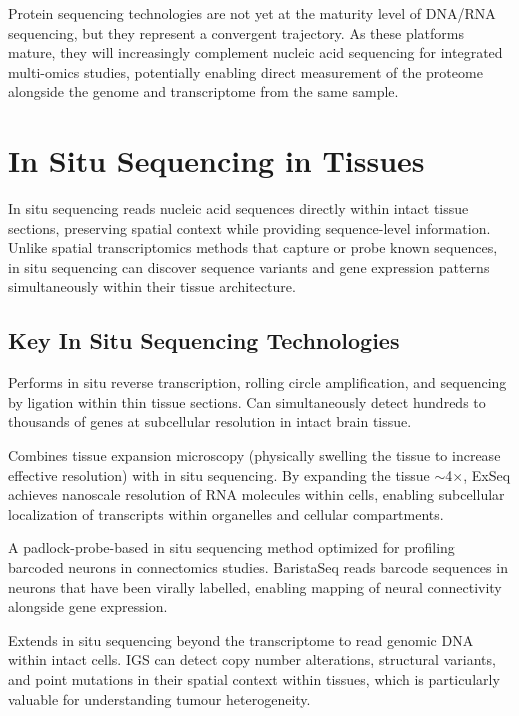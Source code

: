 \begin{tipbox}
Protein sequencing technologies are not yet at the maturity level of DNA/RNA sequencing, but they represent a convergent trajectory. As these platforms mature, they will increasingly complement nucleic acid sequencing for integrated multi-omics studies, potentially enabling direct measurement of the proteome alongside the genome and transcriptome from the same sample.
\end{tipbox}


\section{In Situ Sequencing in Tissues}
\label{sec:emerging:in-situ}

In situ sequencing reads nucleic acid sequences directly within intact tissue sections, preserving spatial context while providing sequence-level information. Unlike spatial transcriptomics methods that capture or probe known sequences, in situ sequencing can discover sequence variants and gene expression patterns simultaneously within their tissue architecture.

\subsection{Key In Situ Sequencing Technologies}
\label{subsec:emerging:in-situ-methods}

\begin{description}[style=nextline, itemsep=3pt]
  \item[STARmap (Spatially-resolved Transcript Amplicon Readout Mapping)] Performs in situ reverse transcription, rolling circle amplification, and sequencing by ligation within thin tissue sections. Can simultaneously detect hundreds to thousands of genes at subcellular resolution in intact brain tissue.

  \item[ExSeq (Expansion Sequencing)] Combines tissue expansion microscopy (physically swelling the tissue to increase effective resolution) with in situ sequencing. By expanding the tissue $\sim$4$\times$, ExSeq achieves nanoscale resolution of RNA molecules within cells, enabling subcellular localization of transcripts within organelles and cellular compartments.

  \item[BaristaSeq] A padlock-probe-based in situ sequencing method optimized for profiling barcoded neurons in connectomics studies. BaristaSeq reads barcode sequences in neurons that have been virally labelled, enabling mapping of neural connectivity alongside gene expression.

  \item[In situ genome sequencing (IGS)] Extends in situ sequencing beyond the transcriptome to read genomic DNA within intact cells. IGS can detect copy number alterations, structural variants, and point mutations in their spatial context within tissues, which is particularly valuable for understanding tumour heterogeneity.
\end{description}

